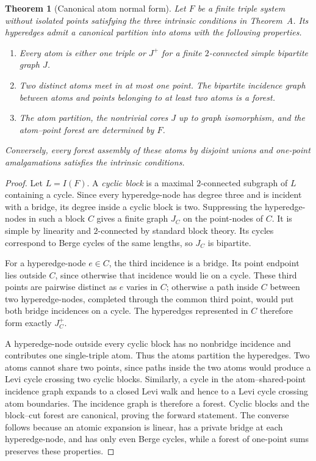 \documentclass[a4paper,11pt,reqno]{amsart}
\theoremstyle{plain}
\newtheorem{theorem}{Theorem}[section]
\theoremstyle{definition}
\theoremstyle{remark}
\begin{document}
\begin{theorem}[Canonical atom normal form]
\label{theorem-canonical-atom-normal-form}
Let $F$ be a finite triple system without isolated points satisfying the three
intrinsic conditions in Theorem~A.  Its hyperedges admit a canonical partition
into \emph{atoms} with the following properties.
\begin{enumerate}
\item Every atom is either one triple or $J^+$ for a finite $2$-connected
simple bipartite graph $J$.
\item Two distinct atoms meet in at most one point.  The bipartite incidence
graph between atoms and points belonging to at least two atoms is a forest.
\item The atom partition, the nontrivial cores $J$ up to graph isomorphism, and
the atom--point forest are determined by $F$.
\end{enumerate}
Conversely, every forest assembly of these atoms by disjoint unions and
one-point amalgamations satisfies the intrinsic conditions.
\end{theorem}
\begin{proof}
Let $L=I(F)$.  A \emph{cyclic block} is a maximal $2$-connected subgraph of
$L$ containing a cycle.  Since every hyperedge-node has degree three and is
incident with a bridge, its degree inside a cyclic block is two.  Suppressing
the hyperedge-nodes in such a block $C$ gives a finite graph $J_C$ on the
point-nodes of $C$.  It is simple by linearity and $2$-connected by standard
block theory.  Its cycles correspond to Berge cycles of the same lengths, so
$J_C$ is bipartite.

For a hyperedge-node $e\in C$, the third incidence is a bridge.  Its point
endpoint lies outside $C$, since otherwise that incidence would lie on a
cycle.  These third points are pairwise distinct as $e$ varies in $C$;
otherwise a path inside $C$ between two hyperedge-nodes, completed through the
common third point, would put both bridge incidences on a cycle.  The
hyperedges represented in $C$ therefore form exactly $J_C^+$.

A hyperedge-node outside every cyclic block has no nonbridge incidence and
contributes one single-triple atom.  Thus the atoms partition the hyperedges.
Two atoms cannot share two points, since paths inside the two atoms would
produce a Levi cycle crossing two cyclic blocks.  Similarly, a cycle in the
atom--shared-point incidence graph expands to a closed Levi walk and hence to
a Levi cycle crossing atom boundaries.  The incidence graph is therefore a
forest.  Cyclic blocks and the block--cut forest are canonical, proving the
forward statement.  The converse follows because an atomic expansion is
linear, has a private bridge at each hyperedge-node, and has only even Berge
cycles, while a forest of one-point sums preserves these properties.
\end{proof}
\end{document}
